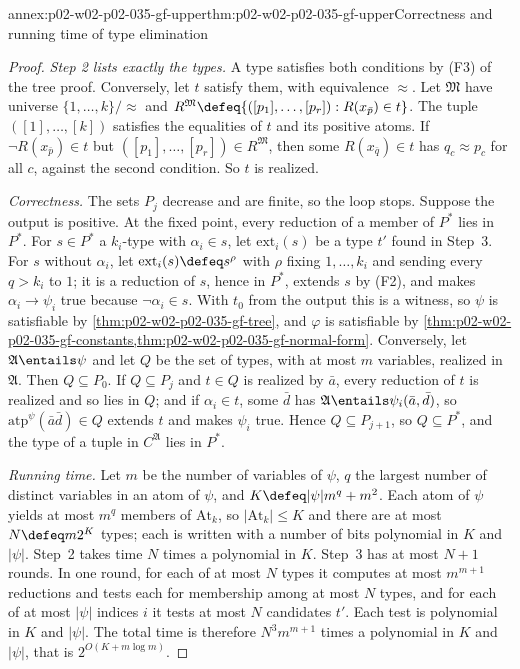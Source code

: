\begin{annexitem}{annex:p02-w02-p02-035-gf-upper}{thm:p02-w02-p02-035-gf-upper}{Correctness and running time of type elimination}
\begin{proof}
\emph{Step 2 lists exactly the types.}  A type satisfies both conditions by
(F3) of the tree proof.  Conversely, let \(t\) satisfy them, with
equivalence \(\approx\).  Let \(\mathfrak M\) have universe
\(\{1,\ldots,k\}/{\approx}\) and
\(R^{\mathfrak M}\defeq\{([p_1],\ldots,[p_r]):R(x_{\bar p})\in t\}\).  The
tuple \(([1],\ldots,[k])\) satisfies the equalities of \(t\) and its
positive atoms.  If \(\neg R(x_{\bar p})\in t\) but
\(([p_1],\ldots,[p_r])\in R^{\mathfrak M}\), then some \(R(x_{\bar q})\in t\)
has \(q_c\approx p_c\) for all \(c\), against the second condition.  So
\(t\) is realized.

\emph{Correctness.}  The sets \(P_j\) decrease and are finite, so the loop
stops.  Suppose the output is positive.  At the fixed point, every
reduction of a member of \(P^{*}\) lies in \(P^{*}\).  For \(s\in P^{*}\) a
\(k_i\)-type with \(\alpha_i\in s\), let \(\mathrm{ext}_i(s)\) be a type
\(t'\) found in Step~3.  For \(s\) without \(\alpha_i\), let
\(\mathrm{ext}_i(s)\defeq s^\rho\) with \(\rho\) fixing \(1,\ldots,k_i\) and
sending every \(q>k_i\) to \(1\); it is a reduction of \(s\), hence in
\(P^{*}\), extends \(s\) by (F2), and makes \(\alpha_i\to\psi_i\) true
because \(\neg\alpha_i\in s\).  With \(t_0\) from the output this is a
witness, so \(\psi\) is satisfiable by \cref{thm:p02-w02-p02-035-gf-tree},
and \(\varphi\) is satisfiable by
\cref{thm:p02-w02-p02-035-gf-constants,thm:p02-w02-p02-035-gf-normal-form}.
Conversely, let \(\mathfrak A\entails\psi\) and let \(Q\) be the set of types,
with at most \(m\) variables, realized in \(\mathfrak A\).  Then
\(Q\subseteq P_0\).  If \(Q\subseteq P_j\) and \(t\in Q\) is realized by
\(\bar a\), every reduction of \(t\) is realized and so lies in \(Q\); and
if \(\alpha_i\in t\), some \(\bar d\) has \(\mathfrak A\entails\psi_i(\bar a,\bar d)\),
so \(\mathrm{atp}^{\psi}(\bar a\bar d)\in Q\) extends \(t\) and makes
\(\psi_i\) true.  Hence \(Q\subseteq P_{j+1}\), so \(Q\subseteq P^{*}\), and
the type of a tuple in \(C^{\mathfrak A}\) lies in \(P^{*}\).

\emph{Running time.}  Let \(m\) be the number of variables of \(\psi\), \(q\)
the largest number of distinct variables in an atom of \(\psi\), and
\(K\defeq\lvert\psi\rvert m^{q}+m^2\).  Each atom of \(\psi\) yields at most
\(m^{q}\) members of \(\mathrm{At}_k\), so \(\lvert\mathrm{At}_k\rvert\leq K\)
and there are at most \(N\defeq m2^{K}\) types; each is written with a
number of bits polynomial in \(K\) and \(\lvert\psi\rvert\).  Step~2 takes
time \(N\) times a polynomial in \(K\).  Step~3 has at most \(N+1\) rounds.
In one round, for each of at most \(N\) types it computes at most
\(m^{m+1}\) reductions and tests each for membership among at most \(N\)
types, and for each of at most \(\lvert\psi\rvert\) indices \(i\) it tests at
most \(N\) candidates \(t'\).  Each test is polynomial in \(K\) and
\(\lvert\psi\rvert\).  The total time is therefore
\(N^{3}m^{m+1}\) times a polynomial in \(K\) and \(\lvert\psi\rvert\), that is
\(2^{O(K+m\log m)}\).


\end{proof}
\end{annexitem}
